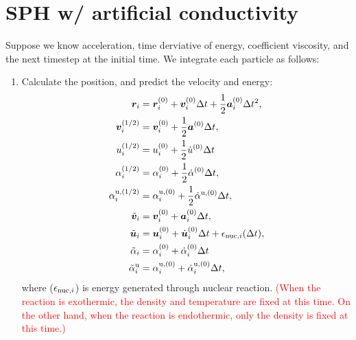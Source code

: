 \documentclass[fleqn,dvipdfmx]{article}
\newcommand{\redtext}[1]{\textcolor{red}{#1}}
\begin{document}
\section{SPH w/ artificial conductivity}

Suppose we know acceleration, time derviative of energy, coefficient
viscosity, and the next timestep at the initial time. We integrate
each particle as follows:
\begin{enumerate}
\item Calculate the position, and predict the velocity and
  energy: \label{item:predict}
  \begin{align}
    \bm{r}_{i} &= \bm{r}^{(0)}_i + \bm{v}^{(0)}_i \Delta t +
    \frac{1}{2} \bm{a}^{(0)}_i \Delta t^2, \\
    \bm{v}^{(1/2)}_i &= \bm{v}^{(0)}_i + \frac{1}{2} \bm{a}^{(0)}
    \Delta t, \\
    u^{(1/2)}_i &= u^{(0)}_i + \frac{1}{2} \dot{u}^{(0)} \Delta t \\
    \alpha^{(1/2)}_i &= \alpha^{(0)}_i + \frac{1}{2}
    \dot{\alpha}^{(0)} \Delta t, \\
    \alpha^{{\rm u},(1/2)}_i &= \alpha^{{\rm u},(0)}_i + \frac{1}{2}
    \dot{\alpha}^{{\rm u},(0)} \Delta t, \\
    \tilde{\bm{v}}_{i} &= \bm{v}^{(0)}_i + \bm{a}^{(0)}_i \Delta t, \\
    \tilde{\bm{u}}_{i} &= \bm{u}^{(0)}_i + \dot{\bm{u}}^{(0)}_i \Delta
    t + \epsilon_{{\rm nuc},i}(\Delta t), \\
    \tilde{\alpha}_i &= \alpha^{(0)}_i + \dot{\alpha}^{(0)}_i \Delta t
    \\
    \tilde{\alpha}^{\rm u}_i &= \alpha^{{\rm u},(0)}_i +
    \dot{\alpha}^{{\rm u},(0)}_i \Delta t,
  \end{align}
  where ($\epsilon_{{\rm nuc},i}$) is energy generated through nuclear
  reaction. \redtext{(When the reaction is exothermic, the density and
    temperature are fixed at this time. On the other hand, when the
    reaction is endothermic, only the density is fixed at this time.)}


\end{enumerate}
\end{document}
